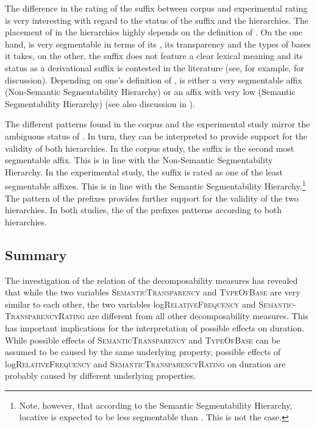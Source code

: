 The difference in the rating of the suffix  between corpus and experimental rating is very interesting with regard to the  status of the suffix and the  hierarchies. The placement of  in the  hierarchies highly depends on the definition of . On the one hand,  is very segmentable in terms of its , its transparency and the types of bases it takes, on the other, the suffix does not feature a clear lexical meaning and its status as a derivational suffix is contested in the literature (see, for example, \citealt{Zwicky.1995,Plag.2003,Giegerich.2012,Bauer.2013} for discussion). Depending on one's definition of ,  is either a very segmentable affix (Non-Semantic Segmentability Hierarchy) or an affix with very low  (Semantic Segmentability Hierarchy) (see also discussion in ). 

The different  patterns found in the corpus and the experimental study mirror the ambiguous  status of . In turn, they can be interpreted to provide support for the validity of both  hierarchies. 
In the corpus study, the suffix  is the second most segmentable affix. This is in line with the Non-Semantic Segmentability Hierarchy. 
In the experimental study, the suffix  is rated as one of the least segmentable affixes. This is in line with the Semantic Segmentability Hierarchy.\footnote{Note, however, that according to the Semantic Segmentability Hierarchy, locative  is expected to be less segmentable than . This is not the case. }
The  pattern of the prefixes provides further support for the validity of the two hierarchies. In both studies, the  of the prefixes patterns according to both hierarchies. 



\subsection{Summary}\largerpage[2]

The investigation of the relation of the decomposability measures has revealed that while the two variables \textsc{SemanticTransparency} and \textsc{TypeOfBase} are very similar to each other, the two variables log\textsc{RelativeFrequency} and \textsc{Semantic-TransparencyRating} are different from all other decomposability measures.
This has important implications for the interpretation of possible  effects on duration. While possible effects of \textsc{SemanticTransparency} and \textsc{TypeOfBase} can be assumed to be caused by the same underlying property, possible effects of log\textsc{RelativeFrequency} and \textsc{SemanticTransparencyRating} on duration are probably caused by different underlying properties.



